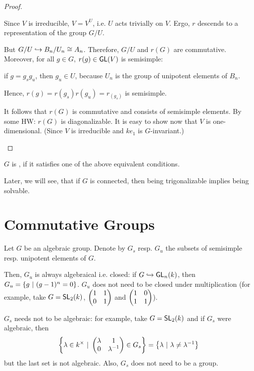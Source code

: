 \begin{proof}
\begin{enumerate}
Since $V$ is irreducible, $V = V^U$, i.e. $U$ acts trivially on $V$. Ergo, $r$ descends to a representation of the group $G/U$.

But $G/U \overset{}{\hookrightarrow} B_n / U_n \overset{}{\cong} A_n$. Therefore, $G/U$ and $r(G)$ are commutative. Moreover, for all $g \in G$, $r(g) \in \textsf{GL}(V)$ is semisimple:

if $g = g_sg_u$, then $g_u \in U$, because $U_n$ is the group of unipotent elements of $B_n$.

Hence, $r(g) = r(g_s) r(g_u) = r_(g_s)$ is semisimple.

It follows that $r(G)$ is commutative and consists of semisimple elements. By some HW: $r(G)$ is diagonalizable. It is easy to show now that $V$ is one-dimensional. (Since $V$ is irreducible and $ke_1$ is $G$-invariant.)
\end{enumerate}
\end{proof}
\begin{definition}
	$G$ is , if it satisfies one of the above equivalent conditions.
\end{definition}
	Later, we will see, that if $G$ is connected, then being trigonalizable implies being solvable.
	
\newpage	
\section{Commutative Groups}
Let $G$ be an algebraic group. Denote by $G_s$ resp. $G_u$ the subsets of semisimple resp. unipotent elements of $G$.

Then, $G_u$ is always algebraical i.e. closed: if $G \overset{}{\hookrightarrow} \textsf{GL}_n(k)$, then $G_u = \left\lbrace g ~ | ~ (g-1)^n = 0\right\rbrace$.
$G_u$ does not need to be closed under multiplication (for example, take $G = \textsf{SL}_2(k)$, $\left(\begin{matrix} 1 & 1 \\ 0 & 1 \end{matrix}\right)$ and $\left(\begin{matrix} 1 & 0\\ 1 & 1 \end{matrix}\right)$).

$G_s$ needs not to be algebraic: for example, take $G = \textsf{SL}_2(k)$ and if $G_s$ were algebraic, then
\[ \left\lbrace\lambda \in k^\times ~ | ~ 
\left(\begin{matrix} \lambda & 1\\ 0 & \lambda^{-1} \end{matrix}\right) \in G_s
\right\rbrace = \left\lbrace \lambda ~ | ~ \lambda \neq \lambda^{-1}\right\rbrace \]
but the last set is not algebraic. Also, $G_s$ does not need to be a group.